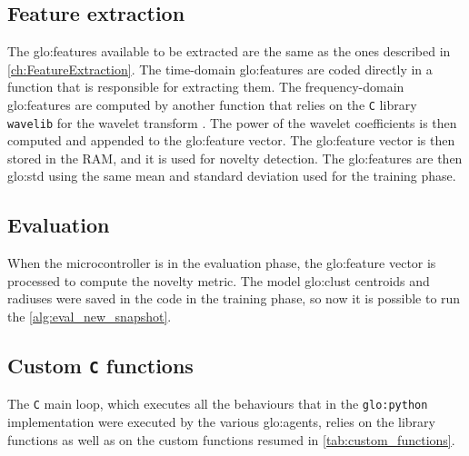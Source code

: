 \subsection{Feature extraction}
The \gls{glo:feature}s available to be extracted are the same as the ones described in \autoref{ch:FeatureExtraction}. The time-domain \gls{glo:feature}s are coded directly in a function that is responsible for extracting them. The frequency-domain \gls{glo:feature}s are computed by another function that relies on the \texttt{C} library \texttt{wavelib} for the wavelet transform \cite{wavelib}. The power of the wavelet coefficients is then computed and appended to the \gls{glo:feature} vector. The \gls{glo:feature} vector is then stored in the RAM, and it is used for novelty detection.
The \gls{glo:feature}s are then \gls{glo:std} using the same mean and standard deviation used for the training phase. 

\subsection{Evaluation}
When the microcontroller is in the evaluation phase, the \gls{glo:feature} vector is processed to compute the novelty metric. The model \gls{glo:clust} centroids and radiuses were saved in the code in the training phase, so now it is possible to run the \autoref{alg:eval_new_snapshot}. 

\subsection{Custom \texttt{C} functions}
The \texttt{C} main loop, which executes all the behaviours that in the \texttt{\gls{glo:python}} implementation were executed by the various \gls{glo:agent}s, relies on the library functions as well as on the custom functions resumed in \autoref{tab:custom_functions}.

